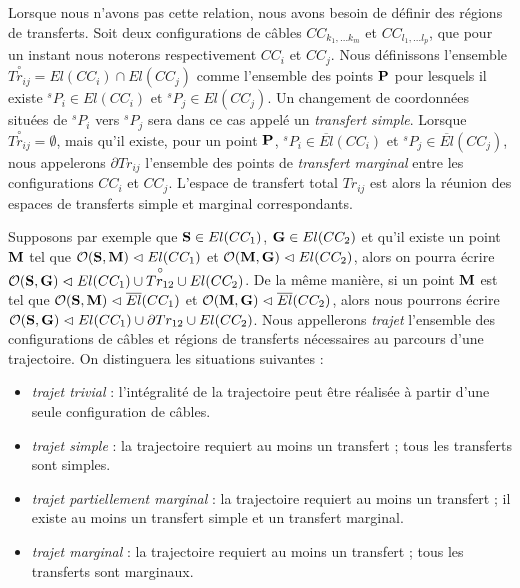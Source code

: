 Lorsque nous n'avons pas cette relation, nous avons besoin de d\'efinir des
r\'egions de transferts. Soit deux configurations de c\^ables
$CC_{k_1, \dots k_m}$ et $CC_{l_1, \dots l_p}$, que pour un instant nous
noterons respectivement $CC_i$ et $CC_j$. Nous d\'efinissons l'ensemble
$\overset{\circ}{Tr_{ij}} = El(CC_i) \cap El(CC_j)$ comme l'ensemble des points
${\bf P}$ pour lesquels il existe ${}^sP_i \in El(CC_i)$ et ${}^sP_j \in
El(CC_j)$. Un changement de coordonn\'ees situ\'ees de ${}^sP_i$ vers ${}^sP_j$
sera dans ce cas appel\'e un {\it transfert simple}. Lorsque
$\overset{\circ}{Tr_{ij}} = \emptyset$, mais qu'il existe, pour un point ${\bf
P}$, ${}^sP_i \in \overline{El}(CC_i)$ et ${}^sP_j \in \overline{El}(CC_j)$, nous
appelerons $\partial Tr_{ij}$ l'ensemble des points de {\it transfert marginal}
entre les configurations $CC_i$ et $CC_j$. L'espace de transfert total $Tr_{ij}$
est alors la r\'eunion des espaces de transferts simple et marginal
correspondants.

Supposons par exemple que ${\bf S} \in El(CC_1)$, ${\bf G} \in El(CC_2)$ et 
qu'il existe un point ${\bf M}$ tel que $\mathcal O({\bf S}, {\bf 
M}) \vartriangleleft El(CC_1)$ et $\mathcal O({\bf M}, {\bf G}) 
\vartriangleleft El(CC_2)$, alors on pourra écrire $\mathcal O({\bf S}, {\bf G}) 
\vartriangleleft El(CC_1) \cup \overset{\circ}{Tr_{12}} \cup El(CC_2)$. De la 
 même manière, si un point ${\bf M}$ est tel que $\mathcal O({\bf S}, {\bf M}) 
\vartriangleleft \overline{El}(CC_1)$ et $\mathcal O({\bf M}, {\bf G}) 
\vartriangleleft \overline{El}(CC_2)$, alors nous pourrons écrire $\mathcal 
O({\bf S}, {\bf G}) \vartriangleleft El(CC_1) \cup \partial Tr_{12} \cup 
El(CC_2)$. Nous appellerons {\it trajet} l'ensemble des configurations de 
c\^ables et régions de transferts nécessaires au parcours d'une trajectoire. On 
distinguera les situations suivantes :
\begin{itemize}
 \item {\it trajet trivial} : l'intégralité de la trajectoire peut être 
réalisée à partir d'une seule configuration de câbles.
 \item {\it trajet simple} : la trajectoire requiert au moins un transfert ; 
tous les transferts sont simples.
 \item {\it trajet partiellement marginal} : la trajectoire requiert au moins 
un transfert ; il existe au moins un transfert simple et un transfert marginal.
 \item {\it trajet marginal} : la trajectoire requiert au moins un transfert 
; tous les transferts sont marginaux.
\end{itemize}

